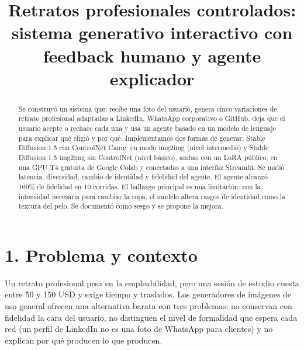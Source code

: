\documentclass[conference]{IEEEtran}
\begin{document}
\title{Retratos profesionales controlados: sistema generativo interactivo con feedback humano y agente explicador}

\author{%
  \and
  \and
  \and
}
\maketitle

\begin{abstract}
Se construyó un sistema que: recibe una foto del usuario, genera cinco variaciones de retrato profesional adaptadas a LinkedIn, WhatsApp corporativo o GitHub, deja que el usuario acepte o rechace cada una y usa un agente basado en un modelo de lenguaje para explicar qué eligió y por qué. Implementamos dos formas de generar: Stable Diffusion 1.5 con ControlNet Canny en modo img2img (nivel intermedio) y Stable Diffusion 1.5 img2img sin ControlNet (nivel básico), ambas con un LoRA público, en una GPU T4 gratuita de Google Colab y conectadas a una interfaz Streamlit. Se midió latencia, diversidad, cambio de identidad y fidelidad del agente. El agente alcanzó 100\% de fidelidad en 10 corridas. El hallazgo principal es una limitación: con la intensidad necesaria para cambiar la ropa, el modelo altera rasgos de identidad como la textura del pelo. Se documentó como sesgo y se propone la mejora.
\end{abstract}
\tableofcontents

\section*{1. Problema y contexto}

Un retrato profesional pesa en la empleabilidad, pero una sesión de estudio cuesta entre 50 y 150 USD y exige tiempo y traslados. Los generadores de imágenes de uso general ofrecen una alternativa barata con tres problemas: no conservan con fidelidad la cara del usuario, no distinguen el nivel de formalidad que espera cada red (un perfil de LinkedIn no es una foto de WhatsApp para clientes) y no explican por qué producen lo que producen.
\end{document}
